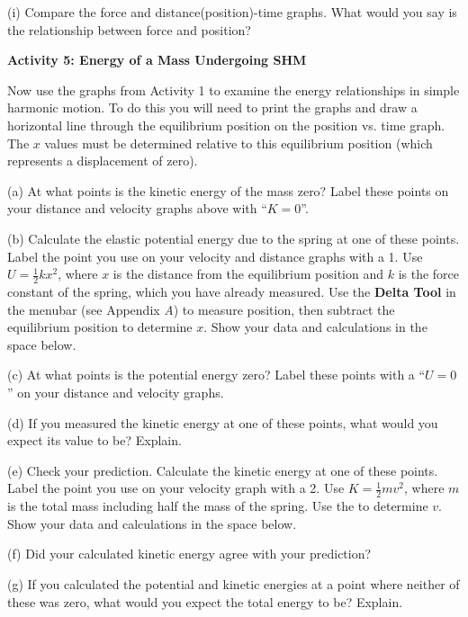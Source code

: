 (i) Compare the force and distance(position)-time graphs. What would you say
is the relationship between force and position? 
\answerspace{20mm}

\textbf{Activity 5: Energy of a Mass Undergoing SHM }

Now use the graphs from Activity 1 to examine the energy relationships
in simple harmonic motion. To do this you will need to print the graphs and draw a horizontal line through the equilibrium position on the position vs. time graph.  
The $x$ values must be determined relative to this equilibrium position (which represents a displacement of zero).

(a) At what points is the kinetic energy of the mass zero? Label these points
on your distance and velocity graphs above with ``$K=0$''.

\pagebreak[2]
(b) Calculate the elastic potential energy due to the spring at one of these
points. Label the point you use on your velocity and distance graphs with a
1. Use $U = \frac{1}{2}kx^{2}$, where  $x$ is the distance from the equilibrium 
position and $k$ is the force constant of the spring, which you have already 
measured. Use the \textbf{Delta Tool} in the menubar (see Appendix {\it A})
to measure position, then subtract the 
equilibrium position to determine $x$. Show your data and calculations 
in the space below. 
\answerspace{20mm}

(c) At what points is the potential energy zero? Label these points with a ``$U=0$''
on your distance and velocity graphs.

(d) If you measured the kinetic energy at one of these points, what would you
expect its value to be? Explain.
\answerspace{15mm}

\pagebreak[2]
(e) Check your prediction. Calculate the kinetic energy at one of these points.
Label the point you use on your velocity graph with a 2. Use 
$K = \frac{1}{2} mv^{2}$, where $m$ is the total mass including half the mass of 
the spring. Use the  to determine $v$. Show your data and 
calculations in the space below.
\answerspace{20mm}

(f) Did your calculated kinetic energy agree with your prediction?
\answerspace{15mm}

(g) If you calculated the potential and kinetic energies at a point where 
neither of these was zero, what would you expect the total energy to be? 
Explain.
\answerspace{20mm}

